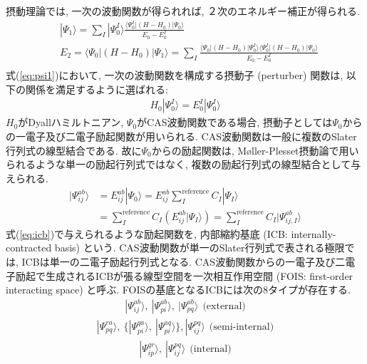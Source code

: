 \documentclass[11pt,pra,aps]{revtex4}
\begin{document}
摂動理論では, 一次の波動関数が得られれば, ２次のエネルギー補正が得られる. 
\begin{align}
  & |\Psi_1\rangle = \sum_I |\Psi_0^I\rangle\frac{\langle\Psi_0^I|\left(H-H_0\right)|\Psi_0\rangle}{E_0-E_0^I} \label{eq:psi1} \\
  & E_2 = \langle\Psi_0|\left(H-H_0\right)|\Psi_1\rangle = \sum_I \frac{\langle\Psi_0|\left(H-H_0\right)|\Psi_0^I\rangle\langle\Psi_0^I|\left(H-H_0\right)|\Psi_0\rangle}{E_0-E_0^I} \\
\end{align}
式(\ref{eq:psi1})において, 一次の波動関数を構成する摂動子 (perturber) 関数は, 以下の関係を満足するように選ばれる:
\begin{align}
  H_0|\Psi_0^I\rangle=E_0^I|\Psi_0^I\rangle \label{eq:eigen}
\end{align}
$H_0$がDyallハミルトニアン, $\Psi_0$がCAS波動関数である場合, 摂動子としては$\Psi_0$からの一電子及び二電子励起関数が用いられる. CAS波動関数は一般に複数のSlater行列式の線型結合である. 故に$\Psi_0$からの励起関数は, M\o ller-Plesset摂動論で用いられるような単一の励起行列式ではなく, 複数の励起行列式の線型結合として与えられる. 
\begin{align}
  |\Psi_{ij}^{ab}\rangle&=E_{ij}^{ab}|\Psi_0\rangle=E_{ij}^{ab}\sum_I^\text{reference} C_I|\Psi_I\rangle \nonumber \\
  &=\sum_I^\text{reference} C_I\left(E_{ij}^{ab}|\Psi_I\rangle\right)=\sum_I^\text{reference} C_I|\Psi_{ij,I}^{ab}\rangle \label{eq:icb}
\end{align}
式(\ref{eq:icb})で与えられるような励起関数を, 内部縮約基底 (ICB: internally-contracted basis) という. \cite{WMeyerMTC} CAS波動関数が単一のSlater行列式で表される極限では, ICBは単一の二電子励起行列式となる. CAS波動関数からの一電子及び二電子励起で生成されるICBが張る線型空間を一次相互作用空間 (FOIS: first-order interacting space) と呼ぶ. FOISの基底となるICBには次の8タイプが存在する. 
\begin{align}
  |\Psi_{ij}^{ab}\rangle,\ |\Psi_{pi}^{ab}\rangle,\ |\Psi_{pq}^{ab}\rangle \ \ \text{(external)} \label{eq:ext}
\end{align}
\begin{align}
  |\Psi_{pq}^{ra}\rangle,\ \{|\Psi_{pi}^{qa}\rangle,\ |\Psi_{pi}^{aq}\rangle\}, |\Psi_{ij}^{pq}\rangle \ \ \text{(semi-internal)} \label{eq:semi-int}
\end{align}
\begin{align}
  |\Psi_{ip}^{qr}\rangle,\ |\Psi_{ij}^{pq}\rangle \ \ \text{(internal)} \label{eq:int}
\end{align}
\end{document}
